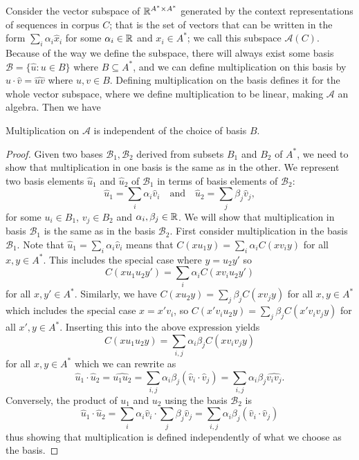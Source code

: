 \documentclass[11pt]{report}
\begin{document}
Consider the vector subspace of $\mathbb{R}^{A^* \times A^*}$ generated by the context representations of sequences in corpus $C$; that is the set of vectors that can be written in the form $\sum_i \alpha_i \hat{x}_i$ for some $\alpha_i \in \mathbb{R}$  and $x_i \in A^*$; we call this subspace $\mathcal{A}(C)$. Because of the way we define the subspace, there will always exist some basis $\mathcal{B} = \{\hat{u} : u \in B\}$ where $B \subseteq A^*$, and we can define multiplication on this basis by $\hat{u}\cdot\hat{v} = \widehat{uv}$ where $u,v \in B$. Defining multiplication on the basis defines it for the whole vector subspace, where we define multiplication to be linear, making $\mathcal{A}$ an algebra.
Then we have
\begin{prop}
Multiplication on $\mathcal{A}$ is independent of the choice of basis $B$.
\end{prop}
\begin{proof}
Given two bases $\mathcal{B}_1 , \mathcal{B}_2$ derived from subsets $B_1$ and $B_2$ of $A^*$, we need to show that multiplication in one basis is the same as in the other. We represent two basis elements $\hat{u}_1$ and $\hat{u}_2$ of $\mathcal{B}_1$ in terms of basis elements of $\mathcal{B}_2$:
$$\hat{u}_1 = \sum_i \alpha_i \hat{v}_i \quad\text{and}\quad
\hat{u}_2 = \sum_j \beta_j \hat{v}_j,$$
for some $u_i \in B_1$, $v_j \in B_2$ and $\alpha_i, \beta_j  \in \mathbb{R}$.
We will show that multiplication in basis $\mathcal{B}_1$ is the same as in the basis $\mathcal{B}_2$. First consider multiplication in the basis $\mathcal{B}_1$. Note that $\hat{u}_1 = \sum_i \alpha_i \hat{v}_i$ means that $C(xu_1y) = \sum_i \alpha_i C(xv_iy)$ for all $x,y \in A^*$. This includes the special case where $y = u_2y'$ so $$C(xu_1u_2y') = \sum_i \alpha_i C(xv_iu_2y')$$ for all $x, y' \in A^*$.
Similarly, we have $C(xu_2y) = \sum_j \beta_j C(xv_jy)$ for all $x,y \in A^*$ which includes the special case $x = x'v_i$, so $C(x'v_iu_2y) = \sum_j \beta_j C(x'v_iv_jy)$ for all $x',y \in A^*$. Inserting this into the above expression yields
$$C(xu_1u_2y) = \sum_{i,j} \alpha_i\beta_j C(xv_iv_jy)$$
for all $x,y \in A^*$ which we can rewrite as
$$\hat{u}_1\cdot\hat{u}_2 = \widehat{u_1u_2} = \sum_{i,j}\alpha_i\beta_j (\hat{v}_i\cdot\hat{v}_j)
= \sum_{i,j}\alpha_i\beta_j \widehat{v_iv_j}.$$
Conversely, the product of $u_1$ and $u_2$ using the basis $\mathcal{B}_2$ is
$$\hat{u}_1\cdot \hat{u}_2 = \sum_i \alpha_i \hat{v}_i \cdot \sum_j \beta_j \hat{v}_j =  \sum_{i,j}\alpha_i\beta_j (\hat{v}_i\cdot\hat{v}_j)$$
thus showing that multiplication is defined independently of what we choose as the basis.
\end{proof}
\end{document}
